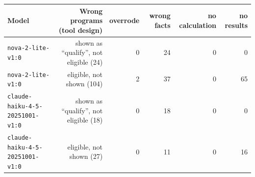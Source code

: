 \begin{tabular}{lrrrrr}
\toprule
Model & Wrong programs (tool design) & overrode & wrong facts & no calculation & no results \\
\midrule
\texttt{nova-2-lite-v1:0} & shown as ``qualify'', not eligible (24) & 0 & 24 & 0 & 0 \\
\texttt{nova-2-lite-v1:0} & eligible, not shown (104) & 2 & 37 & 0 & 65 \\
\texttt{claude-haiku-4-5-20251001-v1:0} & shown as ``qualify'', not eligible (18) & 0 & 18 & 0 & 0 \\
\texttt{claude-haiku-4-5-20251001-v1:0} & eligible, not shown (27) & 0 & 11 & 0 & 16 \\
\bottomrule
\end{tabular}
